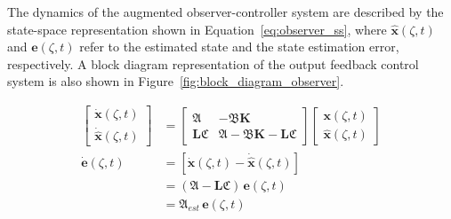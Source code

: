The dynamics of the augmented observer-controller system are described by the state-space representation shown in Equation~\ref{eq:observer_ss}, where $\hat{\bm{x}}(\zeta, t)$ and $\bm{e}(\zeta, t)$ refer to the estimated state and the state estimation error, respectively. A block diagram representation of the output feedback control system is also shown in Figure~\ref{fig:block_diagram_observer}.

\begin{equation}
    \begin{aligned} \label{eq:observer_ss}
        \left[\begin{array}{c}
            \dot{\bm{x}}(\zeta,t) \\ \hline \dot{\hat{\bm{x}}}(\zeta,t)
        \end{array}\right] &= 
        \left[
            \begin{array}{c|c}
                \mathfrak{A} & -\mathfrak{B} \bm{K} \\ \hline
                \bm{L} \mathfrak{C} & \mathfrak{A} - \mathfrak{B} \bm{K} - \bm{L} \mathfrak{C}
            \end{array}
        \right]
        \left[ \begin{array}{c}
            \bm{x}(\zeta,t) \\ \hline \hat{\bm{x}}(\zeta,t) \end{array}
            \right] \\
        \dot{\bm{e}}(\zeta,t) &= \left[ \dot{\bm{x}}(\zeta,t) - \dot{\hat{\bm{x}}}(\zeta,t) \right] \\
        &= (\mathfrak{A} - \bm{L} \mathfrak{C}) \, \bm{e}(\zeta,t) \\
        &= \mathfrak{A}_{est} \, \bm{e}(\zeta,t)
    \end{aligned}
\end{equation}
